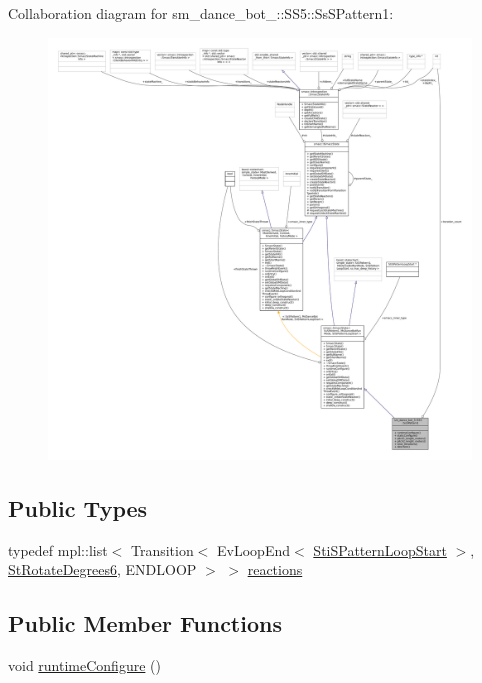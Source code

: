 Collaboration diagram for sm\+\_\+dance\+\_\+bot\+\_\+:\+:S\+S5\+:\+:Ss\+S\+Pattern1\+:
\nopagebreak
\begin{figure}[H]
\begin{center}
\leavevmode
\includegraphics[width=350pt]{structsm__dance__bot__3_1_1SS5_1_1SsSPattern1__coll__graph}
\end{center}
\end{figure}
\subsection*{Public Types}
\begin{DoxyCompactItemize}
\item 
typedef mpl\+::list$<$ Transition$<$ Ev\+Loop\+End$<$ \hyperlink{structsm__dance__bot__3_1_1s__pattern__states_1_1StiSPatternLoopStart}{Sti\+S\+Pattern\+Loop\+Start} $>$, \hyperlink{structsm__dance__bot__3_1_1StRotateDegrees6}{St\+Rotate\+Degrees6}, E\+N\+D\+L\+O\+OP $>$ $>$ \hyperlink{structsm__dance__bot__3_1_1SS5_1_1SsSPattern1_acd97c3196ef81bd22d028a3a735f430a}{reactions}
\end{DoxyCompactItemize}
\subsection*{Public Member Functions}
\begin{DoxyCompactItemize}
\item 
void \hyperlink{structsm__dance__bot__3_1_1SS5_1_1SsSPattern1_ac9a265ec223eca42ff8ab04e91c701fa}{runtime\+Configure} ()
\end{DoxyCompactItemize}
